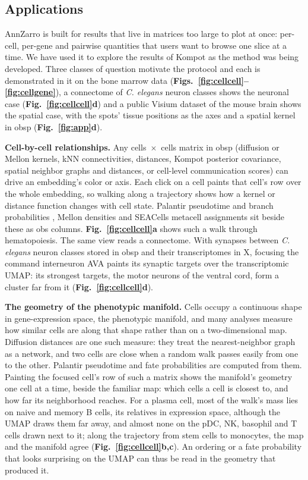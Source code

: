 \subsection{Applications}

AnnZarro is built for results that live in matrices too large to plot at once: per-cell, per-gene and pairwise quantities that users want to browse one slice at a time. We have used it to explore the results of Kompot\cite{otto2025kompot} as the method was being developed. Three classes of question motivate the protocol and each is demonstrated in it on the bone marrow data (\textbf{Figs.~\ref{fig:cellcell}--\ref{fig:cellgene}}), a connectome of \textit{C. elegans} neuron classes shows the neuronal case (\textbf{Fig.~\ref{fig:cellcell}d}) and a public Visium dataset of the mouse brain shows the spatial case, with the spots' tissue positions as the axes and a spatial kernel in obsp (\textbf{Fig.~\ref{fig:app}d}).

\textbf{Cell-by-cell relationships.} Any cells~$\times$~cells matrix in obsp (diffusion or Mellon kernels, kNN connectivities, distances, Kompot posterior covariance, spatial neighbor graphs and distances, or cell-level communication scores) can drive an embedding's color or axis. Each click on a cell paints that cell's row over the whole embedding, so walking along a trajectory shows how a kernel or distance function changes with cell state. Palantir pseudotime and branch probabilities \cite{setty2019}, Mellon densities \cite{otto2024mellon} and SEACells metacell assignments \cite{persad2023} sit beside these as obs columns. \textbf{Fig.~\ref{fig:cellcell}a} shows such a walk through hematopoiesis. The same view reads a connectome. With synapses between \textit{C. elegans} neuron classes\cite{varshney2011} stored in obsp and their transcriptomes\cite{taylor2021} in X, focusing the command interneuron AVA paints its synaptic targets over the transcriptomic UMAP: its strongest targets, the motor neurons of the ventral cord, form a cluster far from it (\textbf{Fig.~\ref{fig:cellcell}d}).

\textbf{The geometry of the phenotypic manifold.} Cells occupy a continuous shape in gene-expression space, the phenotypic manifold, and many analyses measure how similar cells are along that shape rather than on a two-dimensional map. Diffusion distances are one such measure: they treat the nearest-neighbor graph as a network, and two cells are close when a random walk passes easily from one to the other. Palantir pseudotime and fate probabilities are computed from them\cite{setty2019}. Painting the focused cell's row of such a matrix shows the manifold's geometry one cell at a time, beside the familiar map: which cells a cell is closest to, and how far its neighborhood reaches. For a plasma cell, most of the walk's mass lies on naive and memory B cells, its relatives in expression space, although the UMAP draws them far away, and almost none on the pDC, NK, basophil and T cells drawn next to it; along the trajectory from stem cells to monocytes, the map and the manifold agree (\textbf{Fig.~\ref{fig:cellcell}b,c}). An ordering or a fate probability that looks surprising on the UMAP can thus be read in the geometry that produced it.

